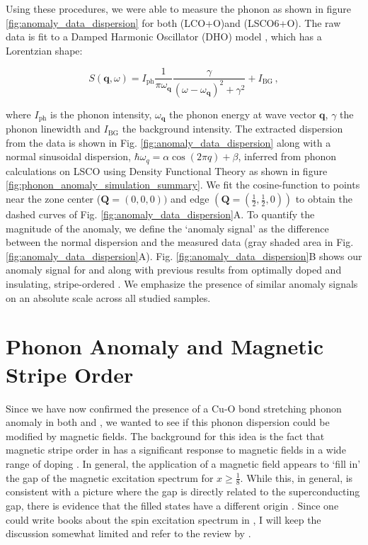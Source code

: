 Using these procedures, we were able to measure the phonon as shown in figure \ref{fig:anomaly_data_dispersion} for both \LCOO{} (LCO+O)and \LSCOOsix{} (LSCO6+O). The raw data is fit to a Damped Harmonic Oscillator (DHO) model \cite{Fak1997}, which has a Lorentzian shape:

\begin{equation}
    S(\bm{q},\omega) = I_\text{ph} \frac{1}{\pi \omega_{\bm{q}}} \frac{\gamma}{(\omega - \omega_{\bm{q}})^2 + \gamma^2} + I_\text{BG} \, ,
\end{equation}

\noindent where $I_\text{ph}$ is the phonon intensity, $\omega_{\bm{q}}$ the phonon energy at wave vector $\bm{q}$, $\gamma$ the phonon linewidth and $I_\text{BG}$ the background intensity. The extracted dispersion from the data is shown in Fig. \ref{fig:anomaly_data_dispersion} along with a normal sinusoidal dispersion, $\hbar\omega_q=\alpha \cos(2 \pi q) + \beta$, inferred from phonon calculations on LSCO using Density Functional Theory as shown in figure \ref{fig:phonon_anomaly_simulation_summary}. We fit the cosine-function to points near the zone center ($\bm{Q}=(0,0,0))$ and edge $(\bm{Q}=(\frac{1}{2},\frac{1}{2},0))$ to obtain the dashed curves of Fig. \ref{fig:anomaly_data_dispersion}A. To quantify the magnitude of the anomaly, we define the `anomaly signal' as the difference between the normal dispersion and the measured data (gray shaded area in Fig. \ref{fig:anomaly_data_dispersion}A). Fig. \ref{fig:anomaly_data_dispersion}B shows our anomaly signal for \LCOO{} and \LSCOOsix{} along with previous results from optimally doped \LSCOopt{} and insulating, stripe-ordered \LNSCO{} \cite{Reznik2007}. We emphasize the presence of similar anomaly signals on an absolute scale across all studied samples.

\section{Phonon Anomaly and Magnetic Stripe Order}
Since we have now confirmed the presence of a Cu-O bond stretching phonon anomaly in both \LCOO{} and \LSCOOsix{}, we wanted to see if this phonon dispersion could be modified by magnetic fields. The background for this idea is the fact that magnetic stripe order in \LSCO{} has a significant response to magnetic fields in a wide range of doping \cite{Chang2008,Kofu2009,Romer2013,Tranquada2004,Lake2001}. In general, the application of a magnetic field appears to `fill in' the gap of the magnetic excitation spectrum for $x \geq \frac{1}{8}$. While this, in general, is consistent with a picture where the gap is directly related to the superconducting gap, there is evidence that the filled states have a different origin \cite{Kofu2009}. Since one could write books about the spin excitation spectrum in \LSCO{}, I will keep the discussion somewhat limited and refer to the review by \citeauthor{Tranquada2013} \cite{Tranquada2013}.

